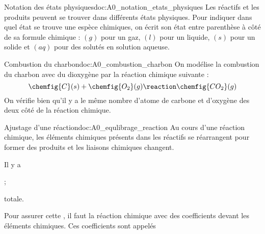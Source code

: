 \begin{doc}{Notation des états physiques}{doc:A0_notation_etats_physiques}
  Les réactifs et les produits peuvent se trouver dans différents états physiques.
  Pour indiquer dans quel état se trouve une espèce chimiques, on écrit son état entre parenthèse à côté de sa formule chimique : $(g)$ pour un gaz, $(l)$ pour un liquide, $(s)$ pour un solide et $(aq)$ pour des solutés en solution aqueuse.
\end{doc}


\begin{doc}{Combustion du charbon}{doc:A0_combustion_charbon}
  On modélise la combustion du charbon avec du dioxygène par la réaction chimique suivante :
  \begin{equation*}
    \chemfig{C}(s) + \chemfig{O_2}(g) \reaction \chemfig{CO_2}(g)
  \end{equation*}
  On vérifie bien qu'il y a le même nombre d'atome de carbone et d'oxygène des deux côté de la réaction chimique.
\end{doc}




\begin{doc}{Ajustage d'une réaction}{doc:A0_equlibrage_reaction}
  Au cours d'une réaction chimique, les éléments chimiques présents dans les réactifs se réarrangent pour former des produits et les liaisons chimiques changent.
  \begin{importants}
    Il y a  
    \begin{listePoints}
      \item {} ;
      \item {} totale.
    \end{listePoints}
  \end{importants}
  \begin{importants}
    Pour assurer cette , il faut  la réaction chimique avec des coefficients devant les éléments chimiques.
    Ces coefficients sont appelés 
  \end{importants}
\end{doc}

